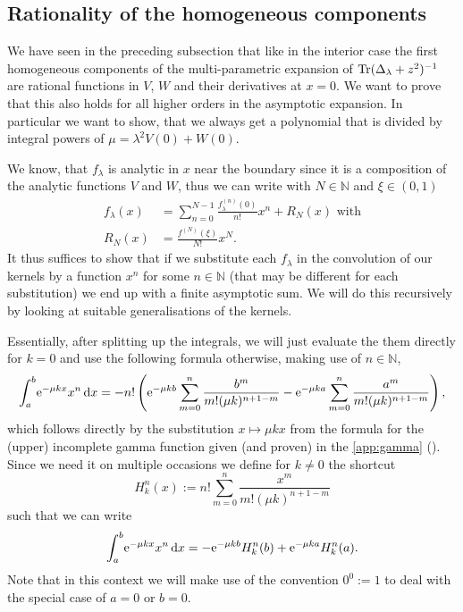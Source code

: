 \subsection{Rationality of the homogeneous components}
We have seen in the preceding subsection that like in the interior case the
first homogeneous components of the multi-parametric expansion of
$\Tr(\Delta_\lambda + z^2)^{-1}$ are rational functions in $V$, $W$ and their
derivatives at $x = 0$. We want to prove that this also holds for all higher
orders in the asymptotic expansion. In particular we want to show, that we
always get a polynomial that is divided by integral powers of $\mu = \lambda^2
V(0) + W(0)$.

We know, that $f_\lambda$ is analytic in $x$ near the boundary since it is a
composition of the analytic functions $V$ and $W$, thus we can write with
$N\in\mathbb{N}$ and $\xi\in(0,1)$
\begin{align*}
  f_\lambda(x) &= \sum_{n=0}^{N-1} \frac{f_\lambda^{(n)}(0)}{n!} x^n + R_N(x)
  \text{ with} \\ R_N(x) &= \frac{f^{(N)}(\xi)}{N!} x^{N}.
\end{align*}
It thus suffices to show that if we substitute each $f_\lambda$ in the
convolution of our kernels by a function $x^{n}$ for some $n\in\mathbb{N}$ (that
may be different for each substitution) we end up with a finite asymptotic sum.
We will do this recursively by looking at suitable generalisations of the
kernels.

Essentially, after splitting up the integrals, we will just evaluate the
them directly for $k=0$ and use the following formula otherwise, making use
of $n\in\mathbb{N}$,
\begin{equation}
  \Integ[b]{a}{x}{\Eto{-\mu kx}x^n}
    = -n!\left(\Eto{-\mu kb}\sum_{m=0}^n \frac{b^m}{m!(\mu k)^{n+1-m}} -
              \Eto{-\mu ka}\sum_{m=0}^n \frac{a^m}{m!(\mu k)^{n+1-m}}\right),
\end{equation}
which follows directly by the substitution $x \mapsto \mu kx$ from the formula
for the (upper) incomplete gamma function given (and proven) in the
\cref{app:gamma} (). Since we need it on multiple
occasions we define for $k\ne 0$ the shortcut
\begin{equation*}
  H^n_k(x) := n!\sum_{m=0}^n \frac{x^m}{m!(\mu k)^{n+1-m}}
\end{equation*}
such that we can write
\begin{equation}
  \label{eqn:ex-integ}
  \Integ[b]{a}{x}{\Eto{-\mu kx}x^n} = -\Eto{-\mu kb}H^n_k(b) + \Eto{-\mu
  ka}H^n_k(a).
\end{equation}
Note that in this context we will make use of the convention $0^0 := 1$ to
deal with the special case of $a = 0$ or $b = 0$.

